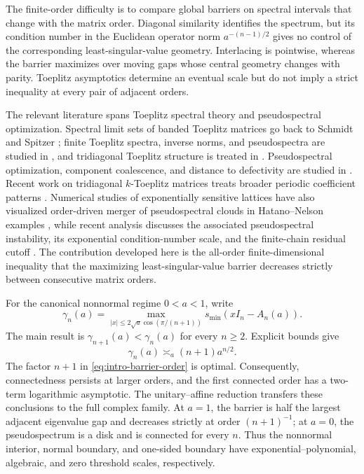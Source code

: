 \documentclass[10pt,twoside]{siamart1116}
\numberwithin{equation}{section}
\begin{document}
The finite-order difficulty is to compare global barriers on spectral
intervals that change with the matrix order.  Diagonal similarity identifies
the spectrum, but its condition number in the Euclidean operator norm
\(a^{-(n-1)/2}\) gives no control of the corresponding least-singular-value
geometry.  Interlacing is pointwise, whereas
the barrier maximizes over moving gaps whose central geometry changes with
parity.  Toeplitz asymptotics determine an eventual scale but do not imply a
strict inequality at every pair of adjacent orders.

The relevant literature spans Toeplitz spectral theory and pseudospectral
optimization.  Spectral limit sets of banded Toeplitz matrices go back to
Schmidt and
Spitzer \cite{SchmidtSpitzer1960}; finite Toeplitz spectra, inverse norms, and
pseudospectra are studied in
\cite{ReichelTrefethen1992,BottcherGrudsky2005}, and tridiagonal Toeplitz
structure is treated in \cite{NoschesePasquiniReichel2013}.  Pseudospectral
optimization, component coalescence, and distance to defectivity are studied
in \cite{BurkeLewisOverton2003,AlamEtAl2011}.  Recent work on tridiagonal
\(k\)-Toeplitz matrices treats broader periodic coefficient patterns
\cite{AmmariEtAl2025,AmmariCorrigendum2026}.  Numerical studies of
exponentially sensitive lattices have also visualized order-driven merger of
pseudospectral clouds in Hatano--Nelson examples
\cite{KiorpelidisMakris2025}, while recent analysis discusses the associated
pseudospectral instability, its exponential condition-number scale, and the
finite-chain residual cutoff \cite{Sirker2026}.
The contribution developed here is the all-order finite-dimensional
inequality that the maximizing least-singular-value barrier decreases
strictly between consecutive matrix orders.

For the canonical nonnormal regime \(0<a<1\), write
\[
 \gamma_n(a)=\max_{|x|\leq2\sqrt a\cos(\pi/(n+1))}
 s_{\min}(xI_n-A_n(a)).
\]
The main result is
\(\gamma_{n+1}(a)<\gamma_n(a)\) for every \(n\geq2\).  Explicit bounds give
\begin{equation}\label{eq:intro-barrier-order}
 \gamma_n(a)\asymp_a(n+1)a^{n/2}.
\end{equation}
The factor \(n+1\) in \eqref{eq:intro-barrier-order} is optimal.  Consequently,
connectedness persists at larger orders, and the first connected order has a
two-term logarithmic asymptotic.  The unitary--affine reduction transfers
these conclusions to the full complex family.  At \(a=1\), the
barrier is half the largest adjacent eigenvalue gap and decreases strictly at
order \((n+1)^{-1}\); at \(a=0\), the pseudospectrum is a disk and is
connected for every \(n\).  Thus the nonnormal interior, normal boundary, and
one-sided boundary have exponential--polynomial, algebraic, and zero
threshold scales, respectively.
\end{document}

